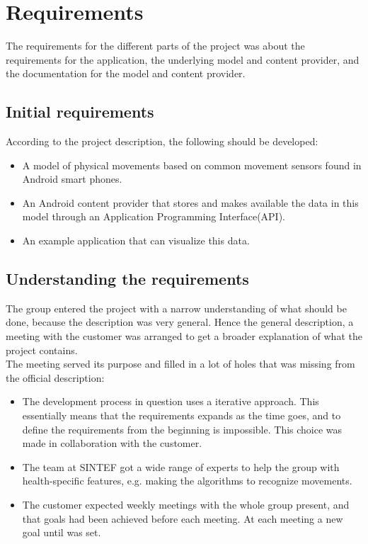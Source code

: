 \chapter{Requirements}
The requirements for the different parts of the project was about the requirements for the application, the underlying model and content provider, and the documentation for the model and content provider. 

\section{Initial requirements}

According to the project description, the following should be developed:
\begin{itemize}
\item A model of physical movements based on common movement sensors found in Android smart phones.
\item An Android content provider that stores and makes available the data in this model through an Application Programming Interface(API).
\item An example application that can visualize this data.
\end{itemize}

\section{Understanding the requirements}

The group entered the project with a narrow understanding of what should be done, because the description was very general. Hence the general description, a meeting with the customer was arranged to get a broader explanation of what the project contains.\\
The meeting served its purpose and filled in a lot of holes that was missing from the official description:
\begin{itemize}
\item The development process in question uses a iterative approach. This essentially means that the requirements expands as the time goes, and to define the requirements from the beginning is impossible. This choice was made in collaboration with the customer.
\item The team at SINTEF got a wide range of experts to help the group with health-specific features, e.g. making the algorithms to recognize movements.
\item The customer expected weekly meetings with the whole group present, and that goals had been achieved before each meeting. At each meeting a new goal until was set.
\end{itemize}